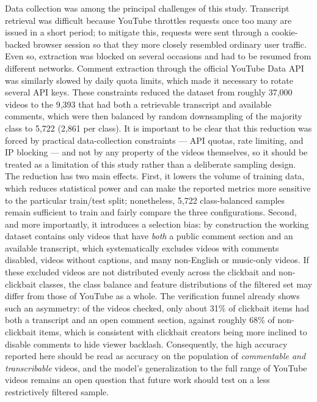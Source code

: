 \documentclass[conference]{IEEEtran}
\begin{document}
Data collection was among the principal challenges of this study. Transcript retrieval was difficult because YouTube throttles requests once too many are issued in a short period; to mitigate this, requests were sent through a cookie-backed browser session so that they more closely resembled ordinary user traffic. Even so, extraction was blocked on several occasions and had to be resumed from different networks. Comment extraction through the official YouTube Data API was similarly slowed by daily quota limits, which made it necessary to rotate several API keys. These constraints reduced the dataset from roughly 37,000 videos to the 9,393 that had both a retrievable transcript and available comments, which were then balanced by random downsampling of the majority class to 5,722 (2,861 per class). It is important to be clear that this reduction was forced by practical data-collection constraints --- API quotas, rate limiting, and IP blocking --- and not by any property of the videos themselves, so it should be treated as a limitation of this study rather than a deliberate sampling design. The reduction has two main effects. First, it lowers the volume of training data, which reduces statistical power and can make the reported metrics more sensitive to the particular train/test split; nonetheless, 5,722 class-balanced samples remain sufficient to train and fairly compare the three configurations. Second, and more importantly, it introduces a selection bias: by construction the working dataset contains only videos that have \emph{both} a public comment section and an available transcript, which systematically excludes videos with comments disabled, videos without captions, and many non-English or music-only videos. If these excluded videos are not distributed evenly across the clickbait and non-clickbait classes, the class balance and feature distributions of the filtered set may differ from those of YouTube as a whole. The verification funnel already shows such an asymmetry: of the videos checked, only about 31\% of clickbait items had both a transcript and an open comment section, against roughly 68\% of non-clickbait items, which is consistent with clickbait creators being more inclined to disable comments to hide viewer backlash. Consequently, the high accuracy reported here should be read as accuracy on the population of \emph{commentable and transcribable} videos, and the model's generalization to the full range of YouTube videos remains an open question that future work should test on a less restrictively filtered sample.
\end{document}
